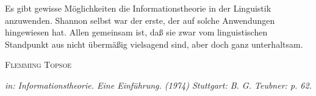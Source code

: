 \addchap{\lsPrefaceTitle}

Es gibt gewisse Möglichkeiten die Informationstheorie in der Linguistik anzuwenden.
Shannon selbst war der erste, der auf solche Anwendungen hingewiesen hat.
Allen gemeinsam ist, daß sie zwar vom linguistischen Standpunkt aus
nicht übermäßig vielsagend sind, aber doch ganz unterhaltsam.%

{\raggedleft\normalsize{\textsc{Flemming Topsoe}}\par\medskip}%
  
{\raggedleft\normalsize{\textit{in: Informationstheorie. Eine Einführung. (1974) \linebreak Stuttgart: B. G. Teubner: p. 62.}}

}


 
 
 